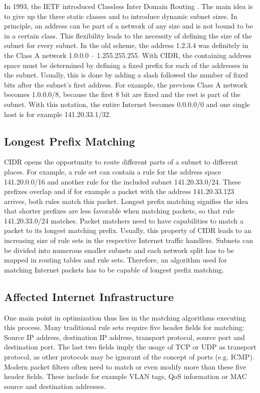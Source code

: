 \documentclass[a4paper,
		12pt,
		parskip=full,
		titlepage
		]{scrartcl}
\begin{document}
In 1993, the IETF introduced Classless Inter Domain Routing\cite{rfc1518} \cite{rfc4632}.
The main idea is to give up the three static classes and to introduce dynamic subnet sizes.
In principle, an address can be part of a network of any size and is not bound to be in a certain class.
This flexibility leads to the necessity of defining the size of the subnet for every subnet.
In the old scheme, the address 1.2.3.4 was definitely in the Class A network 1.0.0.0 -- 1.255.255.255.
With CIDR, the containing address space must be determined by defining a fixed prefix for each of the addresses in the subnet.
Usually, this is done by adding a slash followed the number of fixed bits after the subnet's first address.
For example, the previous Class A network becomes 1.0.0.0/8, because the first 8 bit are fixed and the rest is part of the subnet.
With this notation, the entire Internet becomes 0.0.0.0/0 and one single host is for example 141.20.33.1/32.

\subsection{Longest Prefix Matching}
CIDR opens the opportunity to route different parts of a subnet to different places.
For example, a rule set can contain a rule for the address space 141.20.0.0/16 and another rule for the included subnet 141.20.33.0/24.
These prefixes overlap and if for example a packet with the address 141.20.33.123 arrives, both rules match this packet.
Longest prefix matching signifies the idea that shorter prefixes are less favorable when matching packets, so that rule 141.20.33.0/24 matches.
Packet matchers need to have capabilities to match a packet to its longest matching prefix.
Usually, this property of CIDR leads to an increasing size of rule sets in the respective Internet traffic handlers. %
Subnets can be divided into numerous smaller subnets and each network split has to be mapped in routing tables and rule sets.
Therefore, an algorithm used for matching Internet packets has to be capable of longest prefix matching.

\subsection{Affected Internet Infrastructure}
One main point in optimization thus lies in the matching algorithms executing this process.
Many traditional rule sets require five header fields for matching: Source IP address, destination IP address, transport protocol, source port and destination port.
The last two fields imply the usage of TCP or UDP as transport protocol, as other protocols may be ignorant of the concept of ports (e.g. ICMP).
Modern packet filters often need to match or even modify more than these five header fields.
These include for example VLAN tags, QoS information or MAC source and destination addresses.
\end{document}
